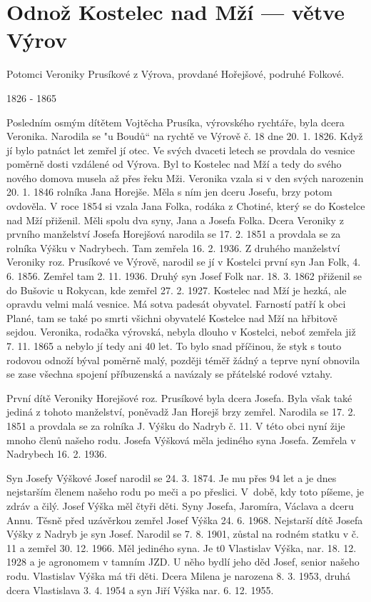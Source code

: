 \documentclass[../dejiny-rodu-prusiku.tex]{subfiles}
\begin{document}
\section{Odnož Kostelec nad Mží — větve Výrov}

Potomci Veroniky Prusíkové z Výrova, provdané Hořejšové, podruhé Folkové.

1826 - 1865

Posledním osmým dítětem Vojtěcha Prusíka, výrovského rychtáře, byla dcera Veronika. Narodila se "u Boudů“ na rychtě ve Výrově č. 18 dne 20. 1. 1826. Když jí bylo patnáct let zemřel jí otec. Ve svých dvaceti letech se provdala do vesnice poměrně dosti vzdálené od Výrova. Byl to Kostelec nad Mží a tedy do svého nového domova musela až přes řeku Mži. Veronika vzala si v den svých narozenin 20. 1. 1846 rolníka Jana Horejše. Měla s ním jen dceru Josefu, brzy potom ovdověla. V roce 1854 si vza­la Jana Folka, rodáka z Chotiné, který se do Kostelce nad Mží přiženil. Měli spolu dva syny, Jana a Josefa Folka. Dcera Veroniky z prvního manželství Josefa Horej­šová narodila se 17. 2. 1851 a provdala se za rolníka Výšku v Nadrybech. Tam zemřela 16. 2. 1936. Z druhého man­želství Veroniky roz. Prusíkové ve Výrově, narodil se jí v Kostelci první syn Jan Folk, 4. 6. 1856. Zemřel tam 2. 11. 1936. Druhý syn Josef Folk nar. 18. 3. 1862 přiženil se do Bušovic u Rokycan, kde zemřel 27. 2. 1927. Kostelec nad Mží je hezká, ale opravdu velmi malá vesnice. Má sotva padesát obyvatel. Farností patří k obci Plané, tam se také po smrti všichni obyvatelé Kostelce nad Mží na hřbitově sejdou. Veronika, rodačka výrovská, nebyla dlou­ho v Kostelci, neboť zemřela již 7. 11. 1865 a nebylo jí tedy ani 40 let. To bylo snad příčinou, že styk s tou­to rodovou odnoží býval poměrně malý, později téměř žádný a teprve nyní obnovila se zase všechna spojení příbuzenská a navázaly se přátelské rodové vztahy.

První dítě Veroniky Horejšové roz. Prusíkové byla dcera Josefa. Byla však také jediná z tohoto manželství, poně­vadž Jan Horejš brzy zemřel. Narodila se 17. 2. 1851 a provdala se za rolníka J. Výšku do Nadryb č. 11. V této obci nyní žije mnoho členů našeho rodu. Josefa Výšková měla jediného syna Josefa. Zemřela v Nadrybech 16. 2. 1936.

Syn Josefy Výškové Josef narodil se 24. 3. 1874. Je mu přes 94 let a je dnes nejstarším členem našeho rodu po meči a po přeslici. V době, kdy toto píšeme, je zdráv a čilý. Josef Výška měl čtyři děti. Syny Josefa, Jaromíra, Václava a dceru Annu. Těsně před uzávěrkou zemřel Josef Výška 24. 6. 1968. Nejstarší dítě Josefa Výšky z Nadryb je syn Josef. Narodil se 7. 8. 1901, zůstal na rodném statku v č. 11 a zemřel 30. 12. 1966. Měl jediného syna. Je t0 Vlastislav Výška, nar. 18. 12. 1928 a je agronomem v tamním JZD. U něho bydlí jeho děd Josef, senior našeho rodu. Vlastislav Výška má tři děti. Dcera Milena je narozena 8. 3. 1953, druhá dcera Vlastislava 3. 4. 1954 a syn Jiří Výška nar. 6. 12. 1955.
\end{document}
